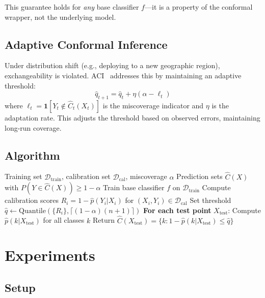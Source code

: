 \documentclass{article}
\begin{document}
This guarantee holds for \textit{any} base classifier $f$---it is a property of the conformal wrapper, not the underlying model.

\subsection{Adaptive Conformal Inference}

Under distribution shift (e.g., deploying to a new geographic region), exchangeability is violated. ACI~\cite{aci2021} addresses this by maintaining an adaptive threshold:
\begin{equation}
    \hat{q}_{t+1} = \hat{q}_t + \eta(\alpha - \ell_t)
\end{equation}
where $\ell_t = \mathbf{1}[Y_t \notin \hat{C}_t(X_t)]$ is the miscoverage indicator and $\eta$ is the adaptation rate. This adjusts the threshold based on observed errors, maintaining long-run coverage.

\subsection{Algorithm}

\begin{algorithm}[t]
\caption{Split Conformal Flood Risk Prediction}
\label{alg:conformal}
\begin{algorithmic}[1]
\REQUIRE Training set $\mathcal{D}_{\text{train}}$, calibration set $\mathcal{D}_{\text{cal}}$, miscoverage $\alpha$
\ENSURE Prediction sets $\hat{C}(X)$ with $P(Y \in \hat{C}(X)) \geq 1-\alpha$
\STATE Train base classifier $f$ on $\mathcal{D}_{\text{train}}$
\STATE Compute calibration scores $R_i = 1 - \hat{p}(Y_i | X_i)$ for $(X_i, Y_i) \in \mathcal{D}_{\text{cal}}$
\STATE Set threshold $\hat{q} \leftarrow \text{Quantile}(\{R_i\}, \lceil(1-\alpha)(n+1)\rceil)$
\STATE \textbf{For each test point} $X_{\text{test}}$:
\STATE \quad Compute $\hat{p}(k | X_{\text{test}})$ for all classes $k$
\STATE \quad Return $\hat{C}(X_{\text{test}}) = \{k : 1 - \hat{p}(k|X_{\text{test}}) \leq \hat{q}\}$
\end{algorithmic}
\end{algorithm}

\section{Experiments}

\subsection{Setup}
\end{document}
